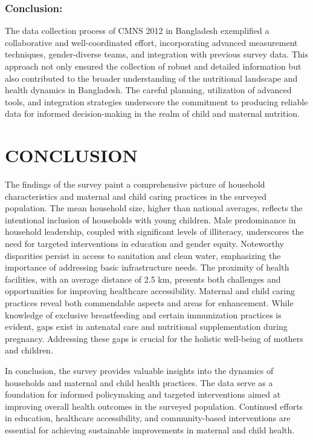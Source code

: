 \documentclass{report}
\begin{document}
\subsection{Conclusion:}
The data collection process of CMNS 2012 in Bangladesh exemplified a collaborative and well-coordinated effort, incorporating advanced measurement techniques, gender-diverse teams, and integration with previous survey data. This approach not only ensured the collection of robust and detailed information but also contributed to the broader understanding of the nutritional landscape and health dynamics in Bangladesh. The careful planning, utilization of advanced tools, and integration strategies underscore the commitment to producing reliable data for informed decision-making in the realm of child and maternal nutrition.



\setcounter{secnumdepth}{-1}
\chapter{\huge{CONCLUSION}}


The findings of the survey paint a comprehensive picture of household characteristics and maternal and child caring practices in the surveyed population. The mean household size, higher than national averages, reflects the intentional inclusion of households with young children. Male predominance in household leadership, coupled with significant levels of illiteracy, underscores the need for targeted interventions in education and gender equity. 
Noteworthy disparities persist in access to sanitation and clean water, emphasizing the importance of addressing basic infrastructure needs. The proximity of health facilities, with an average distance of 2.5 km, presents both challenges and opportunities for improving healthcare accessibility. 
Maternal and child caring practices reveal both commendable aspects and areas for enhancement. While knowledge of exclusive breastfeeding and certain immunization practices is evident, gaps exist in antenatal care and nutritional supplementation during pregnancy. Addressing these gaps is crucial for the holistic well-being of mothers and children.


In conclusion, the survey provides valuable insights into the dynamics of households and maternal and child health practices. The data serve as a foundation for informed policymaking and targeted interventions aimed at improving overall health outcomes in the surveyed population. Continued efforts in education, healthcare accessibility, and community-based interventions are essential for achieving sustainable improvements in maternal and child health.
\end{document}
